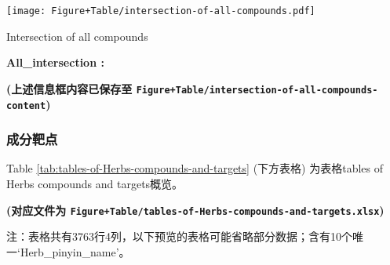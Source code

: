 \documentclass[
]{article}
\begin{document}
\def\@captype{figure}
\begin{center}
\texttt{[image: Figure+Table/intersection-of-all-compounds.pdf]}
\caption{Intersection of all compounds}\label{fig:intersection-of-all-compounds}
\end{center}
\begin{center}\begin{tcolorbox}[colback=gray!10, colframe=gray!50, width=0.9\linewidth, arc=1mm, boxrule=0.5pt]
\textbf{
All\_intersection
:}

\vspace{0.5em}



\vspace{2em}
\end{tcolorbox}
\end{center}

\textbf{(上述信息框内容已保存至 \texttt{Figure+Table/intersection-of-all-compounds-content})}

\hypertarget{ux6210ux5206ux9776ux70b9}{%
\subsubsection{成分靶点}\label{ux6210ux5206ux9776ux70b9}}

Table \ref{tab:tables-of-Herbs-compounds-and-targets} (下方表格) 为表格tables of Herbs compounds and targets概览。

\textbf{(对应文件为 \texttt{Figure+Table/tables-of-Herbs-compounds-and-targets.xlsx})}

\begin{center}\begin{tcolorbox}[colback=gray!10, colframe=gray!50, width=0.9\linewidth, arc=1mm, boxrule=0.5pt]注：表格共有3763行4列，以下预览的表格可能省略部分数据；含有10个唯一`Herb\_pinyin\_name'。
\end{tcolorbox}
\end{center}
\end{document}
